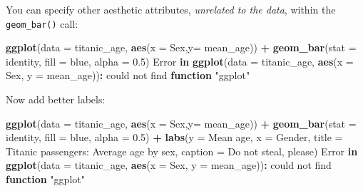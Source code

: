 \documentclass[
]{book}
\newenvironment{Shaded}{\begin{snugshade}}{\end{snugshade}}
\newcommand{\AttributeTok}[1]{\textcolor[rgb]{0.13,0.29,0.53}{#1}}
\newcommand{\ControlFlowTok}[1]{\textcolor[rgb]{0.13,0.29,0.53}{\textbf{#1}}}
\newcommand{\FloatTok}[1]{\textcolor[rgb]{0.00,0.00,0.81}{#1}}
\newcommand{\FunctionTok}[1]{\textcolor[rgb]{0.13,0.29,0.53}{\textbf{#1}}}
\newcommand{\NormalTok}[1]{#1}
\newcommand{\SpecialCharTok}[1]{\textcolor[rgb]{0.81,0.36,0.00}{\textbf{#1}}}
\newcommand{\StringTok}[1]{\textcolor[rgb]{0.31,0.60,0.02}{#1}}
\begin{document}
You can specify other aesthetic attributes, \emph{unrelated to the data}, within the \texttt{geom\_bar()} call:

\begin{Shaded}
\begin{Highlighting}[]
\FunctionTok{ggplot}\NormalTok{(}\AttributeTok{data =}\NormalTok{ titanic\_age, }
       \FunctionTok{aes}\NormalTok{(}\AttributeTok{x =}\NormalTok{ Sex,}\AttributeTok{y=}\NormalTok{ mean\_age)) }\SpecialCharTok{+} 
  \FunctionTok{geom\_bar}\NormalTok{(}\AttributeTok{stat =} \StringTok{\textquotesingle{}identity\textquotesingle{}}\NormalTok{, }\AttributeTok{fill =} \StringTok{\textquotesingle{}blue\textquotesingle{}}\NormalTok{, }\AttributeTok{alpha =} \FloatTok{0.5}\NormalTok{) }
\NormalTok{Error }\ControlFlowTok{in} \FunctionTok{ggplot}\NormalTok{(}\AttributeTok{data =}\NormalTok{ titanic\_age, }\FunctionTok{aes}\NormalTok{(}\AttributeTok{x =}\NormalTok{ Sex, }\AttributeTok{y =}\NormalTok{ mean\_age))}\SpecialCharTok{:}\NormalTok{ could not find }\ControlFlowTok{function} \StringTok{"ggplot"}
\end{Highlighting}
\end{Shaded}

Now add better labels:

\begin{Shaded}
\begin{Highlighting}[]
\FunctionTok{ggplot}\NormalTok{(}\AttributeTok{data =}\NormalTok{ titanic\_age, }
       \FunctionTok{aes}\NormalTok{(}\AttributeTok{x =}\NormalTok{ Sex,}\AttributeTok{y=}\NormalTok{ mean\_age)) }\SpecialCharTok{+} 
  \FunctionTok{geom\_bar}\NormalTok{(}\AttributeTok{stat =} \StringTok{\textquotesingle{}identity\textquotesingle{}}\NormalTok{, }\AttributeTok{fill =} \StringTok{\textquotesingle{}blue\textquotesingle{}}\NormalTok{, }\AttributeTok{alpha =} \FloatTok{0.5}\NormalTok{) }\SpecialCharTok{+} 
  \FunctionTok{labs}\NormalTok{(}\AttributeTok{y =} \StringTok{\textquotesingle{}Mean age\textquotesingle{}}\NormalTok{, }
       \AttributeTok{x =} \StringTok{\textquotesingle{}Gender\textquotesingle{}}\NormalTok{,}
       \AttributeTok{title =} \StringTok{\textquotesingle{}Titanic passengers: Average age by sex\textquotesingle{}}\NormalTok{,}
       \AttributeTok{caption =} \StringTok{\textquotesingle{}Do not steal, please\textquotesingle{}}\NormalTok{)}
\NormalTok{Error }\ControlFlowTok{in} \FunctionTok{ggplot}\NormalTok{(}\AttributeTok{data =}\NormalTok{ titanic\_age, }\FunctionTok{aes}\NormalTok{(}\AttributeTok{x =}\NormalTok{ Sex, }\AttributeTok{y =}\NormalTok{ mean\_age))}\SpecialCharTok{:}\NormalTok{ could not find }\ControlFlowTok{function} \StringTok{"ggplot"}
\end{Highlighting}
\end{Shaded}
\end{document}
